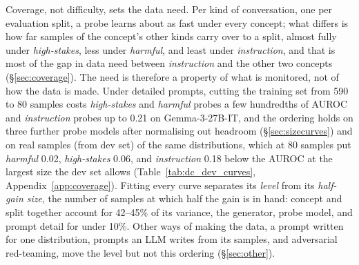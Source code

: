 \documentclass{article} %
\newcommand{\hs}{\emph{high-stakes}}
\newcommand{\harm}{\emph{harmful}}
\newcommand{\instr}{\emph{instruction}}
\begin{document}
Coverage, not difficulty, sets the data need. Per kind of conversation, one per evaluation split, a probe learns about as fast under every concept; what differs is how far samples of the concept's other kinds carry over to a split, almost fully under \hs{}, less under \harm{}, and least under \instr{}, and that is most of the gap in data need between \instr{} and the other two concepts (\S\ref{sec:coverage}). The need is therefore a property of what is monitored, not of how the data is made. Under detailed prompts, cutting the training set from 590 to 80 samples costs \hs{} and \harm{} probes a few hundredths of AUROC and \instr{} probes up to 0.21 on Gemma-3-27B-IT, and the ordering holds on three further probe models after normalising out headroom (\S\ref{sec:sizecurves}) and on real samples (from dev set) of the same distributions, which at 80 samples put \harm{} 0.02, \hs{} 0.06, and \instr{} 0.18 below the AUROC at the largest size the dev set allows (Table~\ref{tab:dc_dev_curves}, Appendix~\ref{app:coverage}). Fitting every curve separates its \emph{level} from its \emph{half-gain size}, the number of samples at which half the gain is in hand: concept and split together account for 42--45\% of its variance, the generator, probe model, and prompt detail for under 10\%. Other ways of making the data, a prompt written for one distribution, prompts an LLM writes from its samples, and adversarial red-teaming, move the level but not this ordering (\S\ref{sec:other}).
\end{document}
